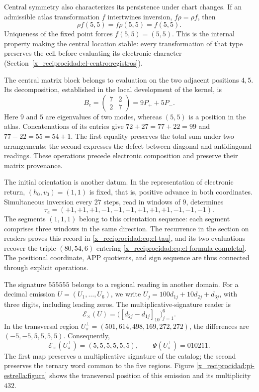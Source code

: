 

Central symmetry also characterizes its persistence under chart
changes. If an admissible atlas transformation \(f\) intertwines
inversion, \(f\rho=\rho f\), then
\[
 \rho f(5,5)=f\rho(5,5)=f(5,5).
\]
Uniqueness of the fixed point forces \(f(5,5)=(5,5)\). This is the
internal property making the central location stable: every
transformation of that type preserves the cell before evaluating its
electronic character (Section~\ref{x_reciprocidad:el-centro:registros}).

The central matrix block belongs to evaluation on the two
adjacent positions \(4,5\). Its decomposition, established in the
local development of the kernel, is
\[
 B_c=\begin{pmatrix}7&2\\2&7\end{pmatrix}=9P_++5P_-.
\]
Here \(9\) and \(5\) are eigenvalues of two modes, whereas
\((5,5)\) is a position in the atlas. Concatenations of its
entries give \(72+27=77+22=99\) and
\(77-22=55=54+1\). The first equality preserves the total sum under
two arrangements; the second expresses the defect between diagonal
and antidiagonal readings. These operations precede electronic
composition and preserve their matrix provenance.

The initial orientation is another datum. In the representation of
electronic return, \((h_0,v_0)=(1,1)\) is fixed, that is, positive
advance in both coordinates. Simultaneous inversion every \(27\)
steps, read in windows of \(9\), determines
\[
 \tau_e=(+1,+1,+1,-1,-1,-1,+1,+1,+1,-1,-1,-1).
\]
The segments \((1,1,1)\) belong to this orientation sequence:
each segment comprises three windows in the same direction. The recurrence
in the section on readers proves this record in
\eqref{x_reciprocidad:eq:el-tau}, and its two evaluations recover the triple
\((80,54,6)\) entering
\eqref{x_reciprocidad:eq:el-formula-completa}. The positional coordinate,
APP quotients, and sign sequence are thus connected through
explicit operations.

The signature \(555555\) belongs to a regional reading in another
domain. For a decimal emission \(U=(U_1,\ldots,U_6)\), we write
\(U_j=100d_{1j}+10d_{2j}+d_{3j}\), with three digits, including
leading zeros. The multiplicative-signature reader is
\[
 \mathcal E_\times(U)
   =\bigl([d_{2j}-d_{1j}]_{10}\bigr)_{j=1}^{6}.
\]
In the transversal region
\(U_\pi^\perp=(501,614,498,169,272,272)\), the differences are
\((-5,-5,5,5,5,5)\). Consequently,
\begin{equation}
 \mathcal E_\times(U_\pi^\perp)=(5,5,5,5,5,5),\qquad
 \Psi(U_\pi^\perp)=010211.
 \label{x_reciprocidad:el-centro:firma-transversal}
\end{equation}
The first map preserves a multiplicative signature of the catalog;
the second preserves the ternary word common to the five regions.
Figure \ref{x_reciprocidad:pi-estrella:figura} shows the transversal position of
this emission and its multiplicity \(432\).

